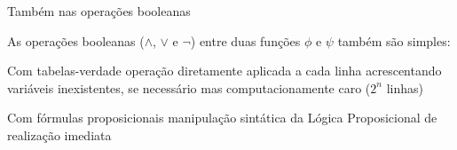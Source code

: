 \expandafter\documentclass\expandafter[table, usenames, svgnames, dvipsnames,14pt, \classopts]{beamer}
\begin{document}
\begin{frame}{Também nas operações booleanas}

    As operações booleanas ($\land$, $\lor$ e $\lnot$) entre duas funções $\phi$ e $\psi$ também são simples:

    \begin{outline}
        \1 Com tabelas-verdade
            \2[-] operação diretamente aplicada a cada linha
            \2[-] acrescentando variáveis inexistentes, se necessário
            \2[-] mas computacionamente caro ($2^n$ linhas)

        \vspace{1em}
            
        \1 Com fórmulas proposicionais
            \2[-] manipulação sintática da Lógica Proposicional
            \2[-] de realização imediata
    \end{outline}
    
\end{frame}
\end{document}

